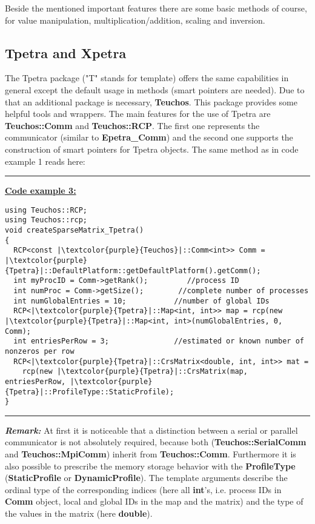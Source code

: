 \documentclass[10pt,a4paper,final,titlepage]{article}
\begin{document}
Beside the mentioned important features there are some basic methods of course, for value manipulation, multiplication/addition, scaling and inversion.

\subsection{Tpetra and Xpetra}
The Tpetra package ("T" stands for template) offers the same capabilities in general except the default usage in methods (smart pointers are needed). Due to that an additional package is necessary, \textbf{Teuchos}. This package provides some helpful tools and wrappers. The main features for the use of Tpetra are \textbf{Teuchos::Comm} and \textbf{Teuchos::RCP}. The first one represents the communicator (similar to \textbf{Epetra\_Comm}) and the second one supports the construction of smart pointers for Tpetra objects. The same method as in code example 1 reads here:
\newpage
\noindent\rule{\textwidth}{0.5pt}
\textbf{\underline{Code example 3:}}
\begin{verbatim}
using Teuchos::RCP;
using Teuchos::rcp;
void createSparseMatrix_Tpetra()
{
  RCP<const |\textcolor{purple}{Teuchos}|::Comm<int>> Comm = |\textcolor{purple}{Tpetra}|::DefaultPlatform::getDefaultPlatform().getComm();
  int myProcID = Comm->getRank();         //process ID
  int numProc = Comm->getSize();        //complete number of processes
  int numGlobalEntries = 10;           //number of global IDs
  RCP<|\textcolor{purple}{Tpetra}|::Map<int, int>> map = rcp(new |\textcolor{purple}{Tpetra}|::Map<int, int>(numGlobalEntries, 0, Comm);
  int entriesPerRow = 3;               //estimated or known number of nonzeros per row
  RCP<|\textcolor{purple}{Tpetra}|::CrsMatrix<double, int, int>> mat =
    rcp(new |\textcolor{purple}{Tpetra}|::CrsMatrix(map, entriesPerRow, |\textcolor{purple}{Tpetra}|::ProfileType::StaticProfile);
}
\end{verbatim}
\noindent\rule{\textwidth}{0.5pt}
\newline \newline
\textbf{\textit{Remark:}} At first it is noticeable that a distinction between a serial or parallel communicator is not absolutely required, because both (\textbf{Teuchos::SerialComm} and \textbf{Teuchos::MpiComm}) inherit from \textbf{Teuchos::Comm}. Furthermore it is also possible to prescribe the memory storage behavior with the \textbf{ProfileType} (\textbf{StaticProfile} or \textbf{DynamicProfile}). The template arguments describe the ordinal type of the corresponding indices (here all \textbf{int}'s, i.e. process IDs in \textbf{Comm} object, local and global IDs in the map and the matrix) and the type of the values in the matrix (here \textbf{double}).
\end{document}
